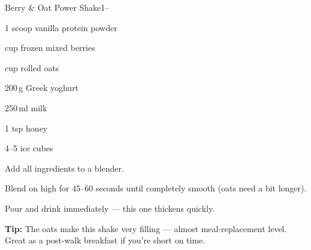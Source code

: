\begin{recipebox}{Berry \& Oat Power Shake}{1}{--}
\begin{ingredients}
  \item 1 scoop vanilla protein powder
  \item \textonehalf{} cup frozen mixed berries
  \item \textonehalf{} cup rolled oats
  \item 200\,g Greek yoghurt
  \item 250\,ml milk
  \item 1 tsp honey
  \item 4--5 ice cubes
\end{ingredients}

\begin{method}
  \item Add all ingredients to a blender.
  \item Blend on high for 45--60 seconds until completely smooth (oats need a bit longer).
  \item Pour and drink immediately --- this one thickens quickly.
\end{method}

\begin{notelist}
  \item \textbf{Tip:} The oats make this shake very filling --- almost meal-replacement level. Great as a post-walk breakfast if you're short on time.
\end{notelist}
\end{recipebox}
